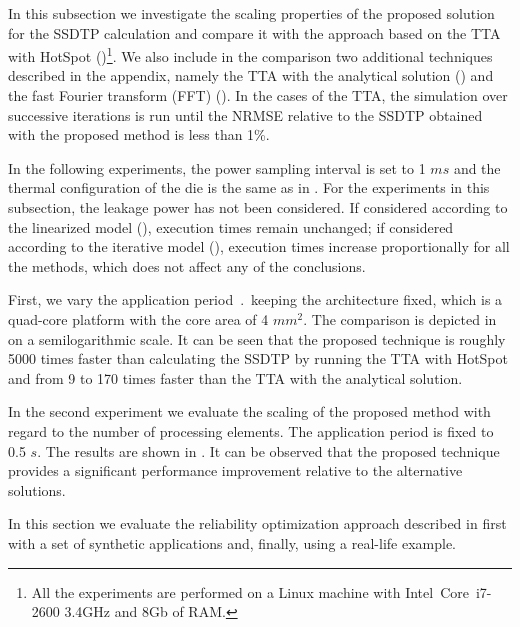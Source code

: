  \label{sec:results-ssdtp}

In this subsection we investigate the scaling properties of the proposed solution for the SSDTP calculation and compare it with the approach based on the TTA with HotSpot ()\footnote{All the experiments are performed on a Linux machine with Intel\textregistered\ Core\texttrademark\ i7-2600 3.4GHz and 8Gb of RAM.}. We also include in the comparison two additional techniques described in the appendix, namely the TTA with the analytical solution () and the fast Fourier transform (FFT) (). In the cases of the TTA, the simulation over successive iterations is run until the NRMSE relative to the SSDTP obtained with the proposed method is less than 1\%.

In the following experiments, the power sampling interval is set to 1 $ms$ and the thermal configuration of the die is the same as in . For the experiments in this subsection, the leakage power has not been considered. If considered according to the linearized model (), execution times remain unchanged; if considered according to the iterative model (), execution times increase proportionally for all the methods, which does not affect any of the conclusions.

First, we vary the application period $\period$ keeping the architecture fixed, which is a quad-core platform with the core area of 4 $mm^2$. The comparison is depicted in  on a semilogarithmic scale. It can be seen that the proposed technique is roughly 5000 times faster than calculating the SSDTP by running the TTA with HotSpot and from 9 to 170 times faster than the TTA with the analytical solution.

In the second experiment we evaluate the scaling of the proposed method with regard to the number of processing elements. The application period is fixed to 0.5 $s$. The results are shown in . It can be observed that the proposed technique provides a significant performance improvement relative to the alternative solutions.

 \label{sec:reliability-results}
In this section we evaluate the reliability optimization approach described in  first with a set of synthetic applications and, finally, using a real-life example.

